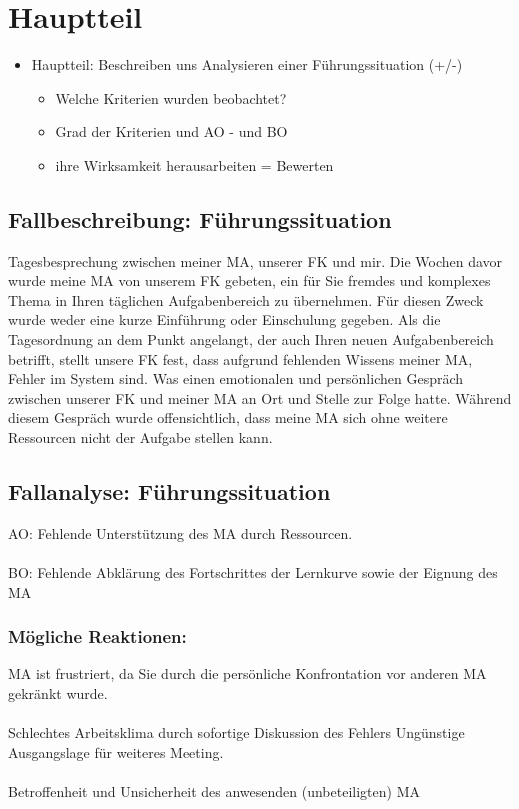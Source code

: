 \chapter{Hauptteil}
\label{chap:hauptteil}

\begin{itemize}
\item Hauptteil: Beschreiben uns Analysieren einer Führungssituation (+/-)
\begin{itemize}
\item Welche Kriterien wurden beobachtet?
\item Grad der Kriterien und \ac{AO} - und \ac{BO}
\item ihre Wirksamkeit herausarbeiten = Bewerten
\end{itemize}
\end{itemize}


\section{Fallbeschreibung: Führungssituation}
Tagesbesprechung zwischen meiner \ac{MA}, unserer \ac{FK} und mir. 
Die Wochen davor wurde meine \ac{MA} von unserem \ac{FK} gebeten, ein für Sie fremdes und komplexes Thema in Ihren täglichen Aufgabenbereich zu übernehmen. 
Für diesen Zweck wurde weder eine kurze Einführung oder Einschulung gegeben.
Als die Tagesordnung an dem Punkt angelangt, der auch Ihren neuen Aufgabenbereich betrifft, stellt unsere \ac{FK} fest, dass aufgrund fehlenden Wissens meiner \ac{MA}, Fehler im System sind. 
Was einen emotionalen und persönlichen Gespräch zwischen unserer \ac{FK} und meiner \ac{MA} an Ort und Stelle zur Folge hatte. 
Während diesem Gespräch wurde offensichtlich, dass meine \ac{MA} sich ohne weitere Ressourcen nicht der Aufgabe stellen kann.

\section{Fallanalyse: Führungssituation}
\ac{AO}: Fehlende Unterstützung des MA durch Ressourcen.\\
\\
\ac{BO}: Fehlende Abklärung des Fortschrittes der Lernkurve sowie der Eignung des \ac{MA}

\subsection*{Mögliche Reaktionen:}

\ac{MA} ist frustriert, da Sie durch die persönliche Konfrontation vor anderen \ac{MA} gekränkt wurde. \\
\\
Schlechtes Arbeitsklima durch sofortige Diskussion des Fehlers
Ungünstige Ausgangslage für weiteres Meeting. \\
\\
Betroffenheit und Unsicherheit des anwesenden (unbeteiligten) \ac{MA} 


